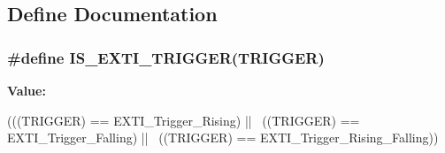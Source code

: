 \subsection{Define Documentation}
\hypertarget{group__EXTI__Exported__Types_gaee95ec6288944a6245696896604e509e}{
\subsubsection[{IS\_\-EXTI\_\-TRIGGER}]{\setlength{\rightskip}{0pt plus 5cm}\#define IS\_\-EXTI\_\-TRIGGER(TRIGGER)}}
\label{group__EXTI__Exported__Types_gaee95ec6288944a6245696896604e509e}
{\bfseries Value:}
\begin{DoxyCode}
(((TRIGGER) == EXTI_Trigger_Rising) || \
                                  ((TRIGGER) == EXTI_Trigger_Falling) || \
                                  ((TRIGGER) == EXTI_Trigger_Rising_Falling))
\end{DoxyCode}
